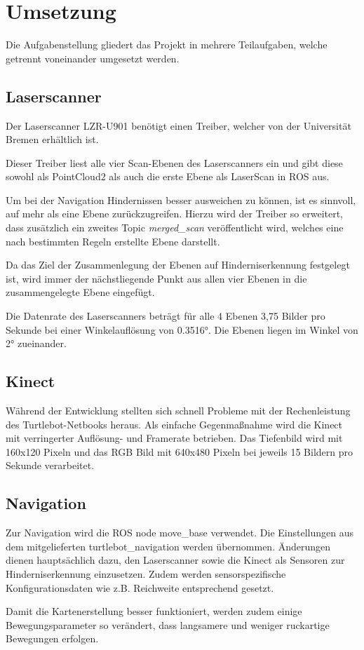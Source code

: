 \section{Umsetzung}
Die Aufgabenstellung gliedert das Projekt in mehrere Teilaufgaben, welche getrennt voneinander umgesetzt werden.

\subsection{Laserscanner}
Der Laserscanner LZR-U901 benötigt einen Treiber, welcher von der Universität Bremen erhältlich ist.

Dieser Treiber liest alle vier Scan-Ebenen des Laserscanners ein und gibt diese sowohl als PointCloud2 als auch die erste Ebene als LaserScan in ROS aus.

Um bei der Navigation Hindernissen besser ausweichen zu können, ist es sinnvoll, auf mehr als eine Ebene zurückzugreifen. Hierzu wird der Treiber so erweitert, dass zusätzlich ein zweites Topic \emph{merged_scan} veröffentlicht wird, welches eine nach bestimmten Regeln erstellte Ebene darstellt.

Da das Ziel der Zusammenlegung der Ebenen auf Hinderniserkennung festgelegt ist, wird immer der nächstliegende Punkt aus allen vier Ebenen in die zusammengelegte Ebene eingefügt.

Die Datenrate des Laserscanners beträgt für alle 4 Ebenen 3,75 Bilder pro Sekunde bei einer Winkelauflösung von 0.3516°. Die Ebenen liegen im Winkel von 2° zueinander.



\subsection{Kinect}
Während der Entwicklung stellten sich schnell Probleme mit der Rechenleistung des Turtlebot-Netbooks heraus. Als einfache Gegenmaßnahme wird die Kinect mit verringerter Auflösung- und Framerate betrieben. Das Tiefenbild wird mit 160x120 Pixeln und das RGB Bild mit 640x480 Pixeln bei jeweils 15 Bildern pro Sekunde verarbeitet.

\subsection{Navigation}
Zur Navigation wird die ROS node move_base verwendet. Die Einstellungen aus dem mitgelieferten turtlebot_navigation werden übernommen. Änderungen dienen hauptsächlich dazu, den Laserscanner sowie die Kinect als Sensoren zur Hinderniserkennung einzusetzen. Zudem werden sensorspezifische Konfigurationsdaten wie z.B. Reichweite entsprechend gesetzt.

Damit die Kartenerstellung besser funktioniert, werden zudem einige Bewegungsparameter so verändert, dass langsamere und weniger ruckartige Bewegungen erfolgen.
